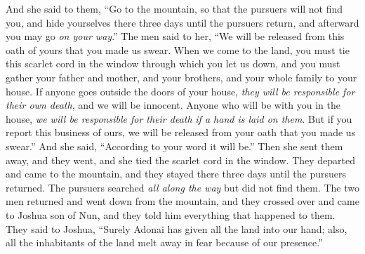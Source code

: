 \begin{biblechapter}
\verse And she said to them, “Go to the mountain, so that the pursuers will not find you, and hide yourselves there three days until the pursuers return, and afterward you may go \textit{on your way}.”
\verse The men said to her, “We will be released from this oath of yours that you made us swear.
\verse When we come to the land, you must tie this scarlet cord in the window through which you let us down, and you must gather your father and mother, and your brothers, and your whole family to your house.
\verse If anyone goes outside the doors of your house, \textit{they will be responsible for their own death}, and we will be innocent. Anyone who will be with you in the house, \textit{we will be responsible for their death} \textit{if a hand is laid on them}.
\verse But if you report this business of ours, we will be released from your oath that you made us swear.”
\verse And she said, “According to your word it will be.” Then she sent them away, and they went, and she tied the scarlet cord in the window.
\verse They departed and came to the mountain, and they stayed there three days until the pursuers returned. The pursuers searched \textit{all along the way} but did not find them.
\verse The two men returned and went down from the mountain, and they crossed over and came to Joshua son of Nun, and they told him everything that happened to them.
\verse They said to Joshua, “Surely Adonai has given all the land into our hand; also, all the inhabitants of the land melt away in fear because of our presence.”
\end{biblechapter}

